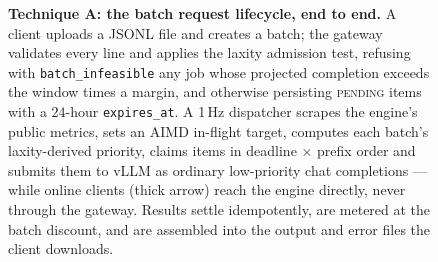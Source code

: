 \begin{figure}[p]
\begin{tikzpicture}
\end{tikzpicture}
\caption[Technique A request lifecycle]{%
  \textbf{Technique A: the batch request lifecycle, end to end.}
  A client uploads a JSONL file and creates a batch; the gateway validates every line
  and applies the laxity admission test, refusing with \texttt{batch\_infeasible} any
  job whose projected completion exceeds the window times a margin, and otherwise
  persisting \textsc{pending} items with a $24$-hour \texttt{expires\_at}.
  A 1\,Hz dispatcher scrapes the engine's public metrics, sets an AIMD in-flight target,
  computes each batch's laxity-derived priority, claims items in deadline $\times$ prefix
  order and submits them to vLLM as ordinary low-priority chat completions --- while
  online clients (thick arrow) reach the engine directly, never through the gateway.
  Results settle idempotently, are metered at the batch discount, and are assembled into
  the output and error files the client downloads.}
\label{fig:lifecycle-a}
\end{figure}
